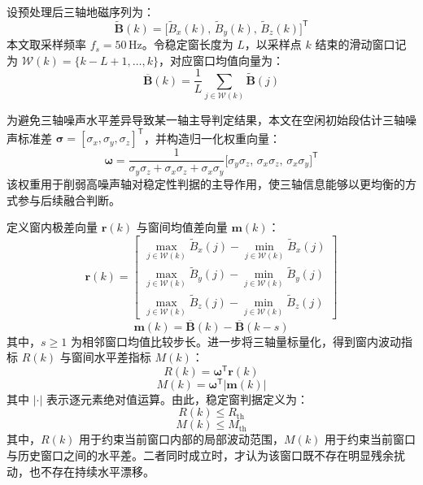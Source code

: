 \documentclass{xdupgthesis}
\begin{document}
设预处理后三轴地磁序列为：
\begin{equation}
    \widetilde{\mathbf{B}}(k)=\big[\widetilde{B}_x(k),\,\widetilde{B}_y(k),\,\widetilde{B}_z(k)\big]^{\mathsf{T}}
\end{equation}
本文取采样频率 $f_s=50\,\mathrm{Hz}$。令稳定窗长度为 $L$，以采样点 $k$ 结束的滑动窗口记为 $\mathcal{W}(k)=\{k-L+1,\ldots,k\}$，对应窗口均值向量为：
\begin{equation}
    \overline{\mathbf{B}}(k)=\frac{1}{L}\sum_{j\in\mathcal{W}(k)}\widetilde{\mathbf{B}}(j)
\end{equation}

为避免三轴噪声水平差异导致某一轴主导判定结果，本文在空闲初始段估计三轴噪声标准差 $\boldsymbol{\sigma}=[\sigma_x,\sigma_y,\sigma_z]^{\mathsf{T}}$，并构造归一化权重向量：
\begin{equation}
    \boldsymbol{\omega}=\frac{1}{\sigma_y\sigma_z+\sigma_x\sigma_z+\sigma_x\sigma_y}
    \big[\sigma_y\sigma_z,\,\sigma_x\sigma_z,\,\sigma_x\sigma_y\big]^{\mathsf{T}}
\end{equation}
该权重用于削弱高噪声轴对稳定性判据的主导作用，使三轴信息能够以更均衡的方式参与后续融合判断。

定义窗内极差向量 $\mathbf{r}(k)$ 与窗间均值差向量 $\mathbf{m}(k)$：
\begin{equation}
    \mathbf{r}(k)=\begin{bmatrix}
        \max\limits_{j\in\mathcal{W}(k)}\widetilde{B}_x(j)-\min\limits_{j\in\mathcal{W}(k)}\widetilde{B}_x(j)\\
        \max\limits_{j\in\mathcal{W}(k)}\widetilde{B}_y(j)-\min\limits_{j\in\mathcal{W}(k)}\widetilde{B}_y(j)\\
        \max\limits_{j\in\mathcal{W}(k)}\widetilde{B}_z(j)-\min\limits_{j\in\mathcal{W}(k)}\widetilde{B}_z(j)
    \end{bmatrix}
\end{equation}
\begin{equation}
    \mathbf{m}(k)=\overline{\mathbf{B}}(k)-\overline{\mathbf{B}}(k-s)
\end{equation}
其中，$s\ge 1$ 为相邻窗口均值比较步长。进一步将三轴量标量化，得到窗内波动指标 $R(k)$ 与窗间水平差指标 $M(k)$：
\begin{equation}
    R(k)=\boldsymbol{\omega}^{\mathsf{T}}\mathbf{r}(k)
\end{equation}
\begin{equation}
    M(k)=\boldsymbol{\omega}^{\mathsf{T}}\left|\mathbf{m}(k)\right|
\end{equation}
其中 $|\cdot|$ 表示逐元素绝对值运算。由此，稳定窗判据定义为：
\begin{equation}
    R(k)\le R_{\mathrm{th}}
\end{equation}
\begin{equation}
    M(k)\le M_{\mathrm{th}}
\end{equation}
其中，$R(k)$ 用于约束当前窗口内部的局部波动范围，$M(k)$ 用于约束当前窗口与历史窗口之间的水平差。二者同时成立时，才认为该窗口既不存在明显残余扰动，也不存在持续水平漂移。
\end{document}
